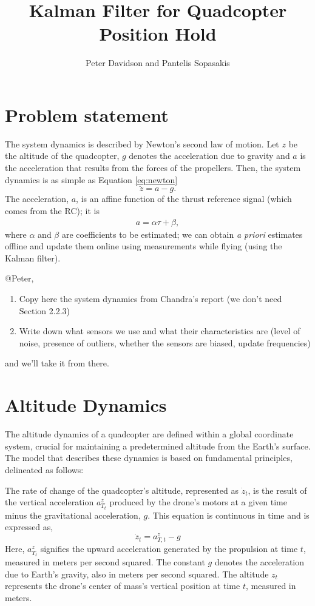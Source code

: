 \documentclass{article}
\title{Kalman Filter for Quadcopter Position Hold}
\author{Peter Davidson and Pantelis Sopasakis}
\begin{document}
\maketitle

\section{Problem statement}
The system dynamics is described by Newton's second law of motion.
Let $z$ be the altitude of the quadcopter, $g$ denotes the acceleration
due to gravity and $a$ is the acceleration that results from the forces
of the propellers. Then, the system dynamics is as simple as
Equation \eqref{eq:newton}
\begin{equation}
    \ddot{z} = a - g.
    \label{eq:newton}
\end{equation}
The acceleration, $a$, is an affine function of the thrust reference signal
(which comes from the RC); it is
\begin{eqnarray}
    a = \alpha \tau + \beta,
\end{eqnarray}
where $\alpha$ and $\beta$ are coefficients to be estimated; we can obtain
\textit{a priori} estimates offline and update them online using measurements
while flying (using the Kalman filter).


@Peter,
\begin{enumerate}
    \item Copy here the system dynamics from Chandra's report (we don't need Section 2.2.3)
    \item Write down what sensors we use and what their characteristics are (level of noise,
          presence of outliers, whether the sensors are biased, update frequencies)
\end{enumerate}
and we'll take it from there.



\newpage
\section{Altitude Dynamics}
The altitude dynamics of a quadcopter are defined within a global coordinate system, crucial for maintaining a predetermined altitude from the Earth's surface. The model that describes these dynamics is based on fundamental principles, delineated as follows:

The rate of change of the quadcopter's altitude, represented as \( \dot{z}_t \), is the result of the vertical acceleration \( a^z_{T_t} \) produced by the drone's motors at a given time minus the gravitational acceleration, \( g \). This equation is continuous in time and is expressed as,
\begin{equation}
\dot{z}_t = a^z_{T,t} - g
\end{equation}
\noindent
Here, \( a^z_{T_t} \) signifies the upward acceleration generated by the propulsion at time \( t \), measured in meters per second squared. The constant \( g \) denotes the acceleration due to Earth's gravity, also in meters per second squared. The altitude \( z_t \) represents the drone's center of mass's vertical position at time \( t \), measured in meters.
\end{document}
